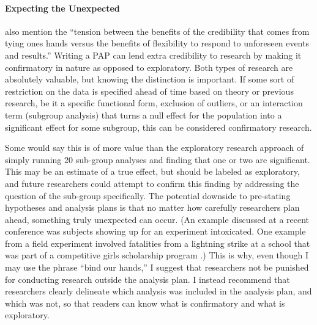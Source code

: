 \documentclass[12pt] {article}
\begin{document}
\paragraph{Expecting the Unexpected}
\cite{glennerster_running_2013} also mention the ``tension between
the benefits of the credibility that comes from tying ones hands versus
the benefits of flexibility to respond to unforeseen events and
results.'' Writing a PAP can lend extra credibility to research by making it confirmatory in nature as opposed to exploratory.
Both types of research are absolutely valuable, but knowing the distinction is important. If some sort of restriction on the data is specified ahead of time based on theory or previous research, be it a specific functional form, exclusion of outliers, or an interaction term (subgroup analysis) that turns a null effect for the population into a significant effect for some subgroup, this can be considered confirmatory research. 

Some would say this is of more value than the exploratory research approach of simply running 20 sub-group analyses and finding that one or two are significant. This may be an estimate of a true effect, but should be labeled as exploratory, and future researchers could attempt to confirm this finding by addressing the question of the sub-group specifically. The potential downside to pre-stating hypotheses and analysis plans is that no matter how carefully researchers plan ahead, something truly unexpected can occur. (An example discussed at a recent conference was subjects showing up for an experiment intoxicated. One example from a field experiment involved fatalities from a lightning strike at a school that was part of a competitive girls scholarship program \citep{kremer2009incentives}.) This is why, even though I may use the phrase ``bind our hands,'' I suggest that researchers not be punished for conducting research outside the analysis plan. I instead recommend that researchers clearly delineate which analysis was included in the analysis plan, and which was not, so that readers can know what is confirmatory and what is exploratory.
\end{document}

